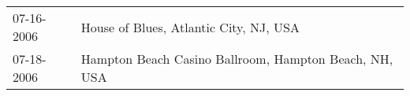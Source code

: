 \begin{supertabular}{ll}
 07-16-2006 &                 House of Blues, Atlantic City, NJ, USA \\
 07-18-2006 &  Hampton Beach Casino Ballroom, Hampton Beach, NH, USA \\
\end{supertabular}
